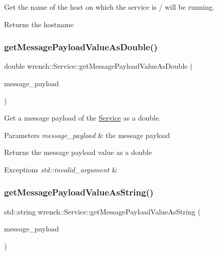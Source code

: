 Get the name of the host on which the service is / will be running. 

\begin{DoxyReturn}{Returns}
the hostname 
\end{DoxyReturn}
\mbox{\label{classwrench_1_1_service_aff087b61b5b17230dc74f11666031f5b}} 
\subsubsection{\texorpdfstring{get\+Message\+Payload\+Value\+As\+Double()}{getMessagePayloadValueAsDouble()}}
{\footnotesize\ttfamily double wrench\+::\+Service\+::get\+Message\+Payload\+Value\+As\+Double (\begin{DoxyParamCaption}\item[{std\+::string}]{message\+\_\+payload }\end{DoxyParamCaption})}



Get a message payload of the \hyperlink{classwrench_1_1_service}{Service} as a double. 


\begin{DoxyParams}{Parameters}
{\em message\+\_\+payload} & the message payload \\
\hline
\end{DoxyParams}
\begin{DoxyReturn}{Returns}
the message payload value as a double
\end{DoxyReturn}

\begin{DoxyExceptions}{Exceptions}
{\em std\+::invalid\+\_\+argument} & \\
\hline
\end{DoxyExceptions}
\mbox{\label{classwrench_1_1_service_acdc27e21d4028a51285c036047d285a1}} 
\subsubsection{\texorpdfstring{get\+Message\+Payload\+Value\+As\+String()}{getMessagePayloadValueAsString()}}
{\footnotesize\ttfamily std\+::string wrench\+::\+Service\+::get\+Message\+Payload\+Value\+As\+String (\begin{DoxyParamCaption}\item[{std\+::string}]{message\+\_\+payload }\end{DoxyParamCaption})}



